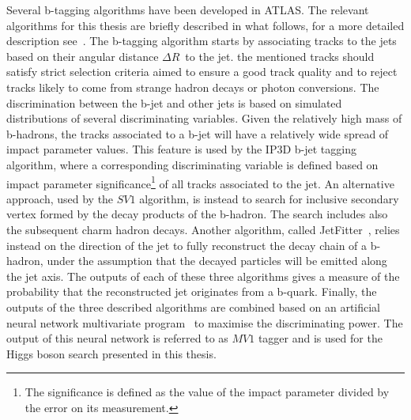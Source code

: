 Several b-tagging algorithms have been developed in ATLAS. The relevant algorithms for
this thesis are briefly described in what follows, for a more detailed description see~\cite{AtlasCSCBook}.
The b-tagging algorithm starts by  associating tracks to the jets based on their angular distance $\Delta R\,$ to the jet. the mentioned 
tracks should satisfy strict selection criteria aimed to ensure a good track quality 
and to reject tracks likely to come from strange hadron decays or photon conversions. 
The discrimination between the b-jet and other jets is based on simulated distributions of several 
 discriminating variables. Given the relatively high mass of b-hadrons, the tracks associated to a 
 b-jet will have a relatively wide spread of impact parameter values. This feature is used by the IP3D b-jet tagging 
algorithm, where a corresponding discriminating variable is defined based on impact parameter significance\footnote{
The significance is defined as the value of the impact parameter divided by the error on its measurement.}
 of all tracks associated to the jet. An alternative approach, used by the $SV1$ algorithm, is instead  to search for inclusive 
secondary vertex formed by the decay products of the b-hadron.  The search includes also 
the subsequent charm hadron decays. Another algorithm, called JetFitter~\cite{jetfitter}, relies instead on the direction of the jet
to fully reconstruct the decay chain of a b-hadron, under the assumption  that the decayed particles will be emitted along the
jet axis. The outputs of each of these three algorithms gives a measure of the probability that the reconstructed jet originates from a b-quark.
Finally, the outputs of the three described algorithms  are combined based on an
artificial neural network multivariate program~\cite{TMVA} to maximise the discriminating power. The output of this neural 
network is referred to as $MV1$ tagger and is used for the Higgs boson search presented in this thesis. 


